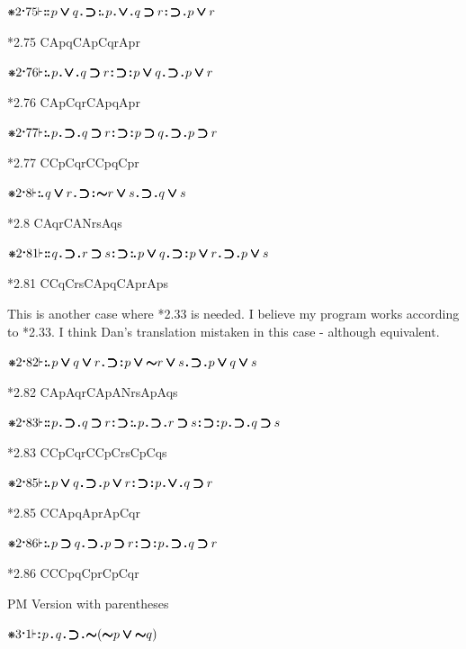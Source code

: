\documentclass[12pt]{article}
\newcommand{\pmthm}{\mathpunct{\text{\scalebox{.5}[1]{$\boldsymbol\vdash$}}}} %
\newcommand{\pmast}{\text{\resizebox{!}{.75\height}{\ding{107}}}} %
\newcommand{\pmcdot}{\text{\raisebox{.05cm}{$\boldsymbol\cdot$}}} %
\newcommand{\pmd}{\hbox{\rule{.3ex}{.3ex}}} %
\newcommand{\pmdd}{\overset{\pmd}{\pmd}} %
\newcommand{\pmdot}{\mathinner{\pmd}}
\newcommand{\pmdott}{\mathinner{\pmdd}}
\newcommand{\pmdottt}{\mathinner{\pmdd\hspace{1pt}\pmd}}
\newcommand{\pmdotttt}{\mathinner{\pmdd\hspace{1pt}\pmdd}}
\newcommand{\pmnot}{\mathord{\ooalign{$\boldsymbol{\sim}\mkern.5mu$\hidewidth\cr$\boldsymbol{\sim}$\cr\hidewidth$\mkern.5mu\boldsymbol{\sim}$}}}
\newcommand{\pmor}{\mathbin{\ooalign{$\boldsymbol{\vee}\mkern.5mu$\hidewidth\cr$\boldsymbol{\vee}$\cr\hidewidth$\mkern.5mu\boldsymbol{\vee}$}}}
\newcommand{\pmimp}{\mathbin{\ooalign{$\boldsymbol{\supset}\mkern.5mu$\hidewidth\cr$\boldsymbol{\supset}$\cr\hidewidth$\mkern.5mu\boldsymbol{\supset}$}}} %
\newcommand{\pmand}{\mathbin{\pmd}}%
\begin{document}
$\pmast 2 \pmcdot 75 \pmthm \pmdotttt p \pmor q \pmdot \pmimp \pmdottt p \pmdot \pmor \pmdot q \pmimp r \pmdott \pmimp \pmdot p \pmor r $

*2.75 CApqCApCqrApr

$\pmast 2 \pmcdot 76 \pmthm \pmdottt p \pmdot \pmor \pmdot q \pmimp r \pmdott \pmimp \pmdott p \pmor q \pmdot \pmimp \pmdot p \pmor r      $

*2.76 CApCqrCApqApr

$\pmast 2 \pmcdot 77 \pmthm \pmdottt p \pmdot \pmimp \pmdot q \pmimp r \pmdott \pmimp \pmdott p \pmimp q \pmdot \pmimp \pmdot p \pmimp r    $

*2.77 CCpCqrCCpqCpr

$\pmast 2 \pmcdot 8 \pmthm \pmdottt q \pmor r \pmdot \pmimp \pmdott \pmnot r \pmor s \pmdot \pmimp \pmdot q \pmor s            $

*2.8 CAqrCANrsAqs

$\pmast 2 \pmcdot 81 \pmthm \pmdotttt q \pmdot \pmimp \pmdot r \pmimp s \pmdott \pmimp \pmdottt p \pmor q \pmdot \pmimp \pmdott p \pmor r \pmdot \pmimp \pmdot p \pmor s $

*2.81 CCqCrsCApqCAprAps

This is another case where *2.33 is needed. I believe my program works according to *2.33. I think Dan's translation mistaken in this case - although equivalent.

$\pmast 2 \pmcdot 82 \pmthm \pmdottt p \pmor q \pmor r \pmdot \pmimp \pmdott p \pmor \pmnot r \pmor s \pmdot \pmimp \pmdot p \pmor q \pmor s   $

*2.82 CApAqrCApANrsApAqs

$\pmast 2 \pmcdot 83 \pmthm \pmdotttt p \pmdot \pmimp \pmdot q \pmimp r \pmdott \pmimp \pmdottt p \pmdot \pmimp \pmdot r \pmimp s \pmdott \pmimp \pmdott p \pmdot \pmimp \pmdot q \pmimp s      $

*2.83 CCpCqrCCpCrsCpCqs

$\pmast 2 \pmcdot 85 \pmthm \pmdottt p \pmor q \pmdot \pmimp \pmdot p \pmor r \pmdott \pmimp \pmdott  p  \pmdot  \pmor \pmdot q \pmimp r      $

*2.85 CCApqAprApCqr

$\pmast 2 \pmcdot 86 \pmthm \pmdottt p \pmimp q \pmdot \pmimp \pmdot p \pmimp r \pmdott \pmimp \pmdott p \pmdot \pmimp \pmdot q \pmimp r $

*2.86 CCCpqCprCpCqr

PM Version with parentheses

$\pmast 3 \pmcdot 1 \pmthm \pmdott p \pmand q \pmdot \pmimp \pmdot \pmnot ( \pmnot p \pmor \pmnot q )    $
\end{document}
